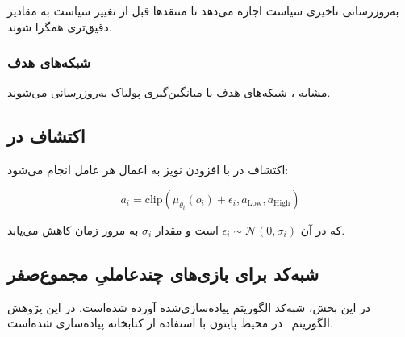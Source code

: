 به‌روزرسانی تاخیری سیاست اجازه می‌دهد تا منتقدها قبل از تغییر سیاست به مقادیر دقیق‌تری همگرا شوند.

\subsubsection{شبکه‌های هدف}

مشابه ، شبکه‌های هدف با میانگین‌گیری پولیاک به‌روزرسانی می‌شوند.


\subsection{اکتشاف در }

اکتشاف در  با افزودن نویز به اعمال هر عامل انجام می‌شود:

\begin{equation}
    a_i = \text{clip}(\mu_{\theta_i}(o_i) + \epsilon_i, a_{\text{Low}}, a_{\text{High}})
\end{equation}

که در آن $\epsilon_i \sim \mathcal{N}(0, \sigma_i)$ است و مقدار $\sigma_i$ به مرور زمان کاهش می‌یابد.

\subsection{شبه‌کد  برای بازی‌های چندعاملیِ مجموع­‌صفر}

در این بخش، شبه‌کد الگوریتم  پیاده‌سازی‌شده آورده شده‌است. در این پژوهش الگوریتم~ در محیط پایتون با استفاده از کتابخانه  \cite{paszke2017automatic} پیاده‌سازی شده‌است.

